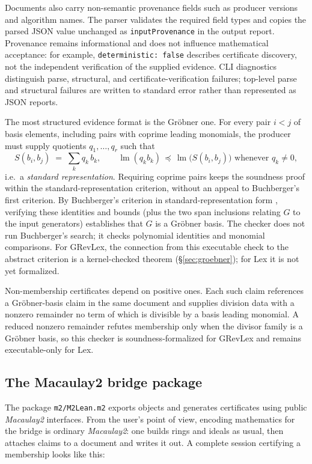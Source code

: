 \documentclass[11pt]{article}
\newcommand{\M}{\textit{Macaulay2}}
\newcommand{\lm}{\operatorname{lm}}
\newcommand{\code}[1]{\texttt{#1}}
\begin{document}
Documents also carry non-semantic provenance fields such as producer
versions and algorithm names.  The parser validates the required field
types and copies the parsed JSON value unchanged as
\code{inputProvenance} in the output report.  Provenance remains
informational and does not influence mathematical acceptance: for
example, \code{deterministic: false} describes certificate discovery,
not the independent verification of the supplied evidence.  CLI diagnostics
distinguish parse, structural, and certificate-verification failures;
top-level parse and structural failures are written to standard error
rather than represented as JSON reports.

The most structured evidence format is the Gr\"obner one.  For every
pair $i<j$ of basis elements, including pairs with coprime leading
monomials, the producer must supply quotients $q_1,\dots,q_r$ such that
\[
  S(b_i,b_j) \;=\; \sum_k q_k\, b_k,
  \qquad
  \lm(q_k b_k) \,\preceq\, \lm\bigl(S(b_i,b_j)\bigr) \text{ whenever } q_k \neq 0,
\]
i.e.\ a \emph{standard representation}.  Requiring coprime pairs keeps
the soundness proof within the standard-representation criterion,
without an appeal to Buchberger's first criterion.  By Buchberger's
criterion in standard-representation form
\cite[Thm.~5.64]{becker-weispfenning}, verifying these identities and bounds (plus
the two span inclusions relating $G$ to the input generators)
establishes that $G$ is a Gr\"obner basis.  The checker does not run
Buchberger's search; it checks polynomial identities and monomial
comparisons.  For GRevLex, the connection from this executable check
to the abstract criterion is a kernel-checked theorem
(\S\ref{sec:groebner}); for Lex it is not yet formalized.

Non-membership certificates depend on positive ones.  Each such claim
references a Gr\"obner-basis claim in the same document and
supplies division data with a nonzero remainder no term of which is
divisible by a basis leading monomial.  A reduced nonzero remainder
refutes membership only when the divisor family is a Gr\"obner basis,
so this checker is soundness-formalized for GRevLex and remains
executable-only for Lex.

\subsection{The Macaulay2 bridge package}\label{sec:m2}

The package \code{m2/M2Lean.m2} exports objects and generates
certificates using public \M{} interfaces.  From the user's point of
view, encoding mathematics for the bridge is ordinary \M{}: one
builds rings and ideals as usual, then attaches claims to a document
and writes it out.  A complete session certifying a membership looks
like this:
\end{document}
